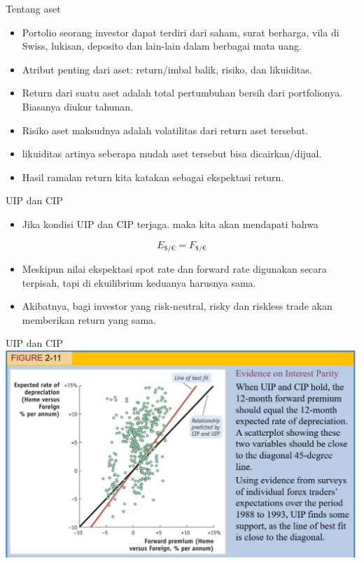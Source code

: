 \documentclass[
  ignorenonframetext,
]{beamer}
\providecommand{\tightlist}{%
  \setlength{\itemsep}{0pt}\setlength{\parskip}{0pt}}\usepackage{longtable,booktabs,array}
\begin{document}
\begin{frame}{Tentang aset}
\label{tentang-aset}
\begin{itemize}
\item
  Portolio seorang investor dapat terdiri dari saham, surat berharga,
  vila di Swiss, lukisan, deposito dan lain-lain dalam berbagai mata
  uang.
\item
  Atribut penting dari aset: return/imbal balik, risiko, dan likuiditas.
\item
  Return dari suatu aset adalah total pertumbuhan bersih dari
  portfolionya. Biasanya diukur tahunan.
\item
  Risiko aset maksudnya adalah volatilitas dari return aset tersebut.
\item
  likuiditas artinya seberapa mudah aset tersebut bisa dicairkan/dijual.
\item
  Hasil ramalan return kita katakan sebagai ekspektasi return.
\end{itemize}
\end{frame}

\begin{frame}{UIP dan CIP}
\label{uip-dan-cip}
\begin{itemize}
\tightlist
\item
  Jika kondisi UIP dan CIP terjaga. maka kita akan mendapati bahwa
\end{itemize}

\[
E_{\$/€}=F_{\$/€}
\]

\begin{itemize}
\item
  Meskipun nilai ekspektasi spot rate dan forward rate digunakan secara
  terpisah, tapi di ekuilibrium keduanya harusnya sama.
\item
  Akibatnya, bagi investor yang risk-neutral, risky dan riskless trade
  akan memberikan return yang sama.
\end{itemize}
\end{frame}

\begin{frame}{UIP dan CIP}
\label{uip-dan-cip-1}
\includegraphics{pic4.png}
\end{frame}
\end{document}
